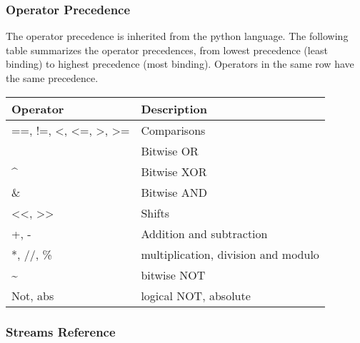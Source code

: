 \documentclass[letterpaper,10pt,english]{sphinxmanual}
\begin{document}
\subsubsection{Operator Precedence}
\label{language_reference/index:id1}
The operator precedence is inherited from the python language. The following
table summarizes the operator precedences, from lowest precedence (least
binding) to highest precedence (most binding). Operators in the same row have
the same precedence.

\begin{tabulary}{\linewidth}{|L|L|}
\hline
\textbf{
Operator
} & \textbf{
Description
}\\
\hline

==, !=, \textless{}, \textless{}=, \textgreater{}, \textgreater{}=
 & 
Comparisons
\\
{\raggedright{}~}
 & 
Bitwise OR
\\

\textasciicircum{}
 & 
Bitwise XOR
\\

\&
 & 
Bitwise AND
\\

\textless{}\textless{}, \textgreater{}\textgreater{}
 & 
Shifts
\\

+, -
 & 
Addition and subtraction
\\

*, //, \%
 & 
multiplication, division and modulo
\\

\textasciitilde{}
 & 
bitwise NOT
\\

Not, abs
 & 
logical NOT, absolute
\\
\hline
\end{tabulary}



\subsubsection{Streams Reference}
\label{language_reference/index:streams-reference}
\end{document}
